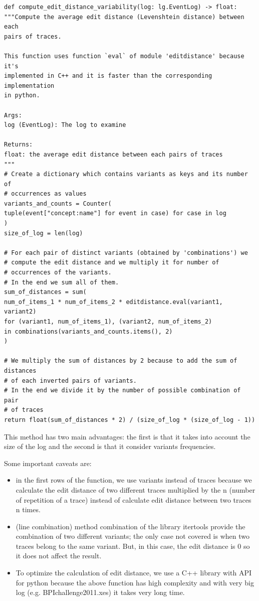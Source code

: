 \documentclass[12pt]{article}
\begin{document}
\begin{verbatim}
def compute_edit_distance_variability(log: lg.EventLog) -> float:
"""Compute the average edit distance (Levenshtein distance) between each
pairs of traces.

This function uses function `eval` of module 'editdistance' because it's
implemented in C++ and it is faster than the corresponding implementation
in python.

Args:
log (EventLog): The log to examine

Returns:
float: the average edit distance between each pairs of traces
"""
# Create a dictionary which contains variants as keys and its number of
# occurrences as values
variants_and_counts = Counter(
tuple(event["concept:name"] for event in case) for case in log
)
size_of_log = len(log)

# For each pair of distinct variants (obtained by 'combinations') we
# compute the edit distance and we multiply it for number of
# occurrences of the variants.
# In the end we sum all of them.
sum_of_distances = sum(
num_of_items_1 * num_of_items_2 * editdistance.eval(variant1, variant2)
for (variant1, num_of_items_1), (variant2, num_of_items_2)
in combinations(variants_and_counts.items(), 2)
)

# We multiply the sum of distances by 2 because to add the sum of distances
# of each inverted pairs of variants.
# In the end we divide it by the number of possible combination of pair
# of traces
return float(sum_of_distances * 2) / (size_of_log * (size_of_log - 1))
\end{verbatim}

This method has two main advantages: the first is that it takes into account the size of the log and the second is that it consider variants frequencies.

Some important caveats are:
\begin{itemize}
	\item in the first rows of the function, we use variants instead of traces because we calculate the edit distance of two different traces multiplied by the n (number of repetition of a trace) instead of calculate edit distance between two traces n times.
	\item (line combination) method combination of the library itertools provide the combination of two different variants; the only case not covered is when two traces belong to the same variant. But, in this case, the edit distance is 0 so it does not affect the result.
	\item To optimize the calculation of edit distance, we use a C++ library with API for python because the above function has high complexity and with very big log (e.g. BPIchallenge2011.xes) it takes very long time.
\end{itemize}
\end{document}
